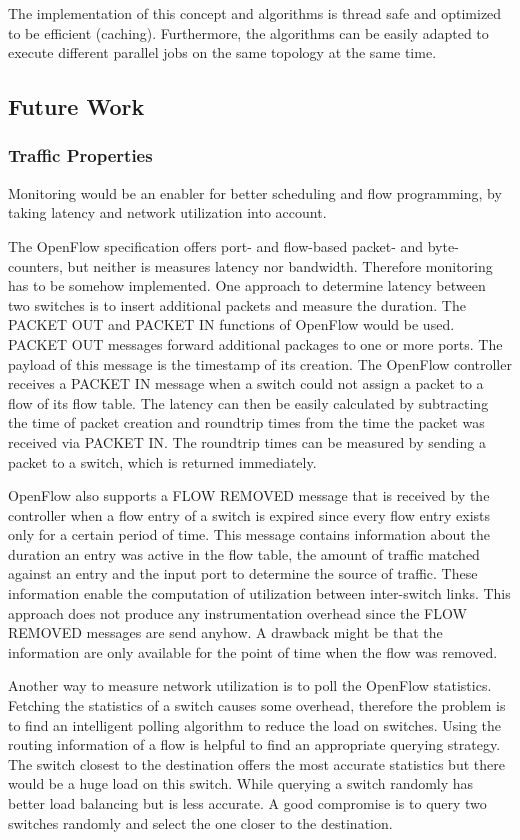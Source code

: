 The implementation of this concept and algorithms is thread safe and optimized to be efficient
(caching). Furthermore, the algorithms can be easily adapted to execute different parallel jobs on
the same topology at the same time.

\subsection{Future Work}
\subsubsection{Traffic Properties}
Monitoring would be an enabler for better scheduling and flow programming, by taking latency and
network utilization into account.

The OpenFlow specification \cite{openflow} offers port- and flow-based packet- and byte-counters,
but neither is measures latency nor bandwidth. Therefore monitoring has to be somehow implemented.
One approach to determine latency between two switches is to insert additional packets and measure
the duration. The PACKET OUT and PACKET IN functions of OpenFlow would be used. PACKET OUT messages
forward additional packages to one or more ports. The payload of this message is the timestamp of
its creation. The OpenFlow controller receives a PACKET IN message when a switch could not assign a
packet to a flow of its flow table. The latency can then be easily calculated by subtracting the
time of packet creation and roundtrip times from the time the packet was received via PACKET IN. The
roundtrip times can be measured by sending a packet to a switch, which is returned immediately.
\cite{monitoringlatency} \cite{opennetmon}

OpenFlow also supports a FLOW REMOVED message that is received by the controller when a flow entry
of a switch is expired since every flow entry exists only for a certain period of time. This message
contains information about the duration an entry was active in the flow table, the amount of traffic
matched against an entry and the input port to determine the source of traffic. These information
enable the computation of utilization between inter-switch links. This approach does not produce any
instrumentation overhead since the FLOW REMOVED messages are send anyhow. A drawback might be that
the information are only available for the point of time when the flow was removed. \cite{flowsense}

Another way to measure network utilization is to poll the OpenFlow statistics. Fetching the
statistics of a switch causes some overhead, therefore the problem is to find an intelligent polling
algorithm to reduce the load on switches. Using the routing information of a flow is helpful to find
an appropriate querying strategy. The switch closest to the destination offers the most accurate
statistics but there would be a huge load on this switch. While querying a switch randomly has
better load balancing but is less accurate. A good compromise is to query two switches randomly and
select the one closer to the destination. \cite{opentm} \cite{opennetmon}

